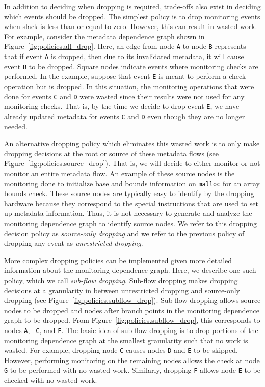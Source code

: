 In addition to deciding when dropping is required, trade-offs also exist in
deciding which events should be dropped.  The simplest policy is to drop 
monitoring events when slack is less than or equal to zero.  However, this can
result in wasted work. For example, consider the metadata dependence graph
shown in Figure~\ref{fig:policies.all_drop}. Here, an edge from node {\tt A} to
node {\tt B} represents that if event {\tt A} is dropped, then due to its
invalidated metadata, it will cause event {\tt B} to be dropped. Square nodes
indicate events where monitoring checks are performed. In the example, suppose
that event {\tt E} is meant to perform a check operation but is dropped.  In
this situation, the monitoring operations that were done for events {\tt C} and
{\tt D} were wasted since their results were not used for any monitoring
checks.  That is, by the time we decide to drop event {\tt E}, we have already
updated metadata for events {\tt C} and {\tt D} even though they are no longer
needed.

An alternative dropping policy which eliminates this wasted work is to only
make dropping decisions at the root or source of these metadata flows (see Figure~\ref{fig:policies.source_drop}). That is,
we will decide to either monitor or not monitor an entire metadata flow. An
example of these source nodes is the monitoring done to initialize base and
bounds information on {\tt malloc} for an array bounds check. These source
nodes are typically easy to identify by the dropping hardware because they
correspond to the special instructions that are used to set up metadata
information. Thus, it is not necessary to generate and analyze the monitoring
dependence graph to identify source nodes. We refer to this dropping decision
policy as \emph{source-only
dropping} and we refer to the previous policy of dropping any event as
\emph{unrestricted dropping}.

More complex dropping policies can be implemented given more detailed
information about the monitoring dependence graph. Here, we describe one such
policy, which we call \emph{sub-flow dropping}. Sub-flow dropping makes
dropping decisions at a granularity in between unrestricted dropping and
source-only dropping (see Figure~\ref{fig:policies.subflow_drop}). Sub-flow
dropping allows source nodes to be dropped and nodes after branch points in the
monitoring dependence graph to be dropped. From
Figure~\ref{fig:policies.subflow_drop}, this corresponds to nodes {\tt A}, {\tt
C}, and {\tt F}. The basic idea of sub-flow dropping is to drop portions of the
monitoring dependence graph at the smallest granularity such that no work is
wasted.
For example,
dropping node {\tt C} causes nodes {\tt D} and {\tt E} to be skipped. However,
performing monitoring on the remaining nodes allows the check at node {\tt G}
to be performed with no wasted work. Similarly, dropping {\tt F} allows node
{\tt E} to be checked with no wasted work.

